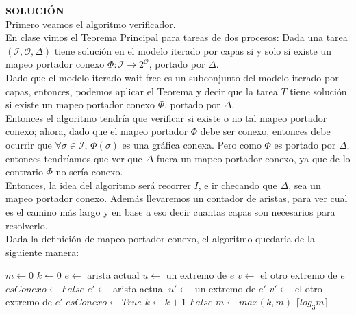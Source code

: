 \documentclass{article}
\begin{document}
\begin{enumerate}
{    \textbf{SOLUCIÓN}\\
    Primero veamos el algoritmo verificador.\\
    En clase vimos el Teorema Principal para tareas de dos procesos: Dada una tarea $(\mathcal{I},\mathcal{O},\Delta)$
    tiene solución en el modelo iterado por capas si y solo si existe un mapeo portador conexo
    $\Phi: \mathcal{I} \rightarrow 2^{\mathcal{O}}$, portado por $\Delta$.\\
    Dado que el modelo iterado wait-free es un subconjunto del modelo iterado por capas, entonces, podemos
    aplicar el Teorema y decir que la tarea $T$ tiene solución si existe un mapeo portador conexo $\Phi$, portado por $\Delta$.\\
    Entonces el algoritmo tendría que verificar si existe o no tal mapeo portador conexo; ahora, dado que el mapeo portador
    $\Phi$ debe ser conexo, entonces debe ocurrir que $\forall\sigma\in\mathcal{I}$, $\Phi(\sigma)$ es una
    gráfica conexa. Pero como $\Phi$ es portado por $\Delta$, entonces tendríamos que ver que $\Delta$ fuera un mapeo portador
    conexo, ya que de lo contrario $\Phi$ no sería conexo.\\
    Entonces, la idea del algoritmo será recorrer $I$, e ir checando que $\Delta$, sea un mapeo portador conexo.
    Además llevaremos un contador de aristas, para ver cual es el camino más largo y en base a eso decir cuantas capas
    son necesarios para resolverlo.\\
    Dada la definición de mapeo portador conexo, el algoritmo quedaría de la siguiente manera:\\
    
    \begin{algorithmic}
    \STATE $m \leftarrow 0$ 
    \STATE $k \leftarrow 0$ 
    \STATE $e \leftarrow $ arista actual
    \STATE $u \leftarrow $ un extremo de $e$
    \STATE $v \leftarrow $ el otro extremo de $e$
    \STATE $esConexo \leftarrow False$
    \STATE $e' \leftarrow $ arista actual
    \STATE $u' \leftarrow $ un extremo de $e'$
    \STATE $v' \leftarrow $ el otro extremo de $e'$
    \STATE $esConexo \leftarrow True$
    \ENDIF
    \STATE $k \leftarrow k + 1$
    \ENDIF
    \ENDFOR
    \RETURN $False$
    \ENDIF
    \STATE $m \leftarrow max(k, m)$
    \ENDFOR
    \RETURN $\lceil log_{3} m \rceil$
    \end{algorithmic}

}
\end{enumerate}
\end{document}
